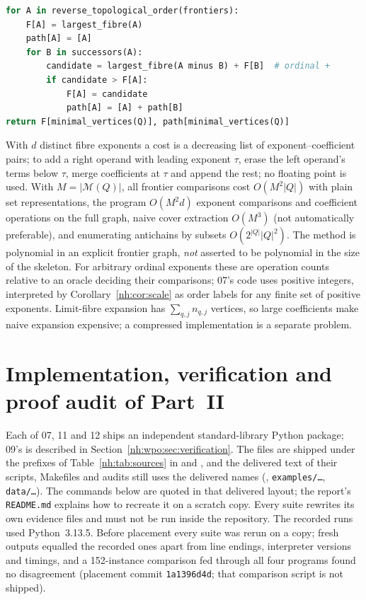 \documentclass[11pt,a4paper]{article}
\theoremstyle{definition}
\theoremstyle{remark}
\newcommand{\M}{\mathcal M}
\begin{document}
\begin{lstlisting}[language=Python,caption={Height computation after the frontiers are enumerated (07).}]
for A in reverse_topological_order(frontiers):
    F[A] = largest_fibre(A)
    path[A] = [A]
    for B in successors(A):
        candidate = largest_fibre(A minus B) + F[B]  # ordinal +
        if candidate > F[A]:
            F[A] = candidate
            path[A] = [A] + path[B]
return F[minimal_vertices(Q)], path[minimal_vertices(Q)]
\end{lstlisting}

With $d$ distinct fibre exponents a cost is a decreasing list of
exponent--coefficient pairs; to add a right operand with leading exponent
$\tau$, erase the left operand's terms below $\tau$, merge coefficients at $\tau$
and append the rest; no floating point is used. With $M=|\M(Q)|$, all frontier
comparisons cost $O(M^2|Q|)$ with plain set representations, the program
$O(M^2d)$ exponent comparisons and coefficient operations on the full graph,
naive cover extraction $O(M^3)$ (not automatically preferable), and enumerating
antichains by subsets $O(2^{|Q|}|Q|^2)$. The method is polynomial in an explicit
frontier graph, \emph{not} asserted to be polynomial in the size of the
skeleton. For arbitrary ordinal exponents these are operation counts relative to
an oracle deciding their comparisons; 07's code uses positive integers,
interpreted by Corollary~\ref{nh:cor:scale} as order labels for any finite set of
positive exponents. Limit-fibre expansion has $\sum_{q,j}n_{q,j}$ vertices, so
large coefficients make naive expansion expensive; a compressed implementation
is a separate problem.
\section{Implementation, verification and proof audit of Part~II}
\label{nh:sec:verification}

Each of 07, 11 and 12 ships an independent standard-library Python package; 09's
is described in Section~\ref{nh:wpo:sec:verification}. The files are shipped
under the prefixes of Table~\ref{nh:tab:sources} in  and
, and the delivered text of their scripts, Makefiles and audits
still uses the delivered names (, \texttt{examples/\dots},
\texttt{data/\dots}). The commands below are quoted in that delivered layout;
the report's \texttt{README.md} explains how to recreate it on a scratch copy.
Every suite rewrites its own evidence files and must not be run inside the
repository. The recorded runs used Python~3.13.5. Before placement every suite
was rerun on a copy; fresh outputs equalled the recorded ones apart from line
endings, interpreter versions and timings, and a 152-instance comparison fed
through all four programs found no disagreement (placement commit
\texttt{1a1396d4d}; that comparison script is not shipped).
\end{document}
